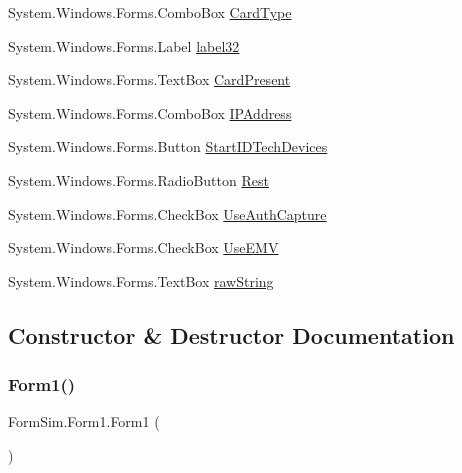 \begin{DoxyCompactItemize}
\item 
System.\+Windows.\+Forms.\+Combo\+Box \mbox{\hyperlink{class_form_sim_1_1_form1_afbf09ae833347b353523d5a1ecef4084}{Card\+Type}}
\item 
System.\+Windows.\+Forms.\+Label \mbox{\hyperlink{class_form_sim_1_1_form1_ad0954b3637c21b4723d55b5be1cbebbe}{label32}}
\item 
System.\+Windows.\+Forms.\+Text\+Box \mbox{\hyperlink{class_form_sim_1_1_form1_a1599ed57c79662b977f3b13c88eee502}{Card\+Present}}
\item 
System.\+Windows.\+Forms.\+Combo\+Box \mbox{\hyperlink{class_form_sim_1_1_form1_ac09f0457ff2972d0a9274e7b0756682f}{I\+P\+Address}}
\item 
System.\+Windows.\+Forms.\+Button \mbox{\hyperlink{class_form_sim_1_1_form1_aea5b20a781fbb2efd0fbd5088a67aaaa}{Start\+I\+D\+Tech\+Devices}}
\item 
System.\+Windows.\+Forms.\+Radio\+Button \mbox{\hyperlink{class_form_sim_1_1_form1_a14067ff6c523d592fe72f29c399dbb2e}{Rest}}
\item 
System.\+Windows.\+Forms.\+Check\+Box \mbox{\hyperlink{class_form_sim_1_1_form1_ab6b0b12adccc16ecd16c7733a7e480ed}{Use\+Auth\+Capture}}
\item 
System.\+Windows.\+Forms.\+Check\+Box \mbox{\hyperlink{class_form_sim_1_1_form1_a19fbb1137bb7748a46e64c6b63e3059a}{Use\+E\+MV}}
\item 
System.\+Windows.\+Forms.\+Text\+Box \mbox{\hyperlink{class_form_sim_1_1_form1_a029d572a6091d81b931a2fc9358c4f67}{raw\+String}}
\end{DoxyCompactItemize}


\subsection{Constructor \& Destructor Documentation}
\mbox{\label{class_form_sim_1_1_form1_aaf140bd5cccdffe2b9f6c4a9b856b5ca}} 
\subsubsection{\texorpdfstring{Form1()}{Form1()}}
{\footnotesize\ttfamily Form\+Sim.\+Form1.\+Form1 (\begin{DoxyParamCaption}{ }\end{DoxyParamCaption})\hspace{0.3cm}{\ttfamily [inline]}}



